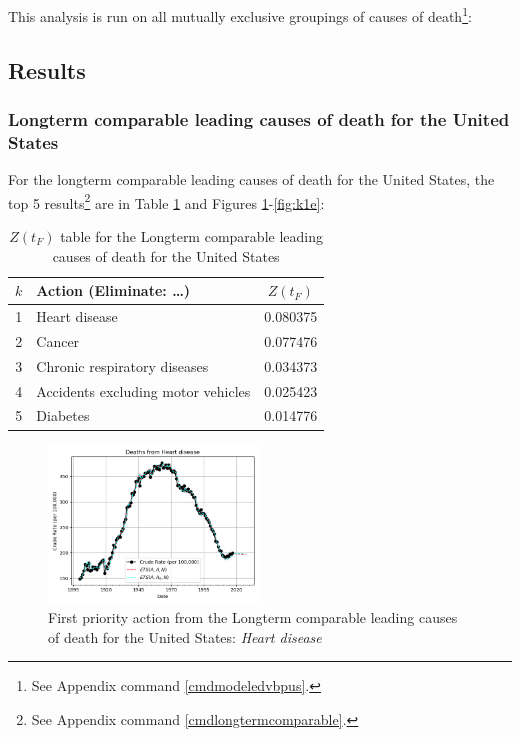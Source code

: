 \documentclass[10pt, a4paper, twocolumn]{IEEEconf}
\begin{document}
This analysis is run on all mutually exclusive groupings of causes of death\footnote{See Appendix command \ref{cmdmodeledvbpus}.}:

\clearpage

\subsection{Results}

\subsubsection{Longterm comparable leading causes of death for the United States}

For the longterm comparable leading causes of death for the United States, the top 5 results\footnote{See Appendix command \ref{cmdlongtermcomparable}.} are in Table \ref{table:ztable1} and Figures \ref{fig:k1a}-\ref{fig:k1e}:

\begin{table}[H]
  \centering
  \begin{tabular}{clc}
    \toprule
      $k$ & Action (Eliminate: \ldots) & $Z(t_F)$ \\
    \midrule
      1 &                      Heart disease & 0.080375 \\
      2 &                             Cancer & 0.077476 \\
      3 &       Chronic respiratory diseases & 0.034373 \\
      4 & Accidents excluding motor vehicles & 0.025423 \\
      5 &                           Diabetes & 0.014776 \\
    \bottomrule
  \end{tabular}
  \caption{$Z(t_F)$ table for the Longterm comparable leading causes of death for the United States}
  \label{table:ztable1}
\end{table}

\begin{figure}[H]
  \centering
  \includegraphics[width=0.5\textwidth]{results/US_ICD_LONGTERM_COMPARABLE_LEADING/Heart_disease_ets.png}
  \caption{First priority action from the Longterm comparable leading causes of death for the United States: \textit{Heart disease}}\label{fig:k1a}
\end{figure}
\end{document}
